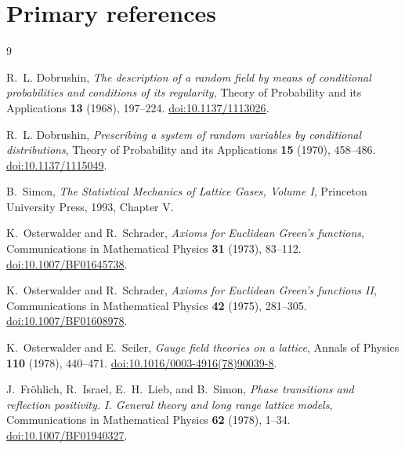 \documentclass[11pt]{article}
\theoremstyle{definition}
\theoremstyle{remark}
\begin{document}
\section*{Primary references}

\begin{thebibliography}{9}

R.~L. Dobrushin,
\emph{The description of a random field by means of conditional probabilities
and conditions of its regularity},
Theory of Probability and its Applications \textbf{13} (1968), 197--224.
\href{https://doi.org/10.1137/1113026}{doi:10.1137/1113026}.

R.~L. Dobrushin,
\emph{Prescribing a system of random variables by conditional distributions},
Theory of Probability and its Applications \textbf{15} (1970), 458--486.
\href{https://doi.org/10.1137/1115049}{doi:10.1137/1115049}.

B.~Simon,
\emph{The Statistical Mechanics of Lattice Gases, Volume I},
Princeton University Press, 1993, Chapter V.

K.~Osterwalder and R.~Schrader,
\emph{Axioms for Euclidean Green's functions},
Communications in Mathematical Physics \textbf{31} (1973), 83--112.
\href{https://doi.org/10.1007/BF01645738}{doi:10.1007/BF01645738}.

K.~Osterwalder and R.~Schrader,
\emph{Axioms for Euclidean Green's functions II},
Communications in Mathematical Physics \textbf{42} (1975), 281--305.
\href{https://doi.org/10.1007/BF01608978}{doi:10.1007/BF01608978}.

K.~Osterwalder and E.~Seiler,
\emph{Gauge field theories on a lattice},
Annals of Physics \textbf{110} (1978), 440--471.
\href{https://doi.org/10.1016/0003-4916(78)90039-8}{doi:10.1016/0003-4916(78)90039-8}.

J.~Fr\"ohlich, R.~Israel, E.~H.~Lieb, and B.~Simon,
\emph{Phase transitions and reflection positivity. I. General theory and
long range lattice models},
Communications in Mathematical Physics \textbf{62} (1978), 1--34.
\href{https://doi.org/10.1007/BF01940327}{doi:10.1007/BF01940327}.

\end{thebibliography}
\end{document}
